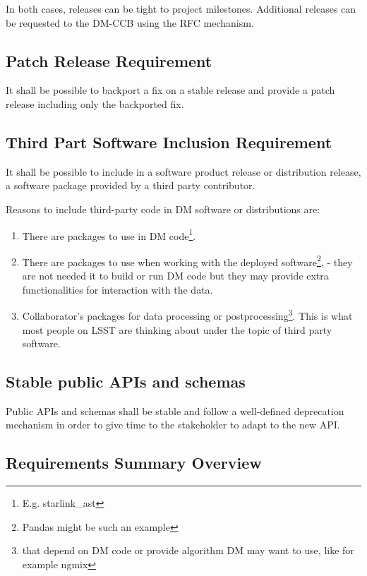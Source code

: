 In both cases, releases can be tight to project milestones.
Additional releases can be requested to the DM-CCB using the RFC mechanism.


\subsection{Patch Release Requirement} \label{sec:backport}

It shall be possible to backport a fix on a stable release and provide a patch release including only the backported fix.


\subsection{Third Part Software Inclusion Requirement} \label{sec:thirdsw}

It shall be possible to include in a software product release or distribution release, a software package provided by a third party contributor.

Reasons to include third-party code in DM software or distributions are:
\begin{enumerate}
\item There are packages to  use in DM code\footnote{E.g. starlink\_ast}.  \label{item:depend}
\item There are packages to use when working with the deployed software\footnote{Pandas  might be such an example}, - they are not needed it to build or run DM code but they may provide extra functionalities for interaction with the data.\label{item:want}
\item Collaborator's packages for data processing or postprocessing\footnote{that depend on DM code or provide algorithm DM may want to use, like for example ngmix}. This is what most people on LSST are thinking about under the topic of third party software. \label{item:colab}
\end{enumerate}


\subsection{Stable public APIs and schemas} \label{sec:stable}

Public APIs and schemas shall be stable and follow a well-defined deprecation mechanism in order to give time to the stakeholder to adapt to the new API.


\subsection{Requirements Summary Overview} \label{sec:overview}

